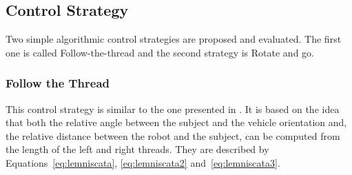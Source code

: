 \documentclass[journal]{IEEEtran}
\begin{document}
%
%
%
%



\subsection{Control Strategy}

Two simple algorithmic control strategies are proposed and evaluated.  The first one is called Follow-the-thread and the second strategy is Rotate and go.  %

\subsubsection{Follow the Thread}

This control strategy is similar to the one presented in \cite{Ortlieb2016}.  It is based on the idea that both the relative angle between the subject and the vehicle orientation and, the relative distance between the robot and the subject, can be computed from the length of the left and right threads.  They are described by Equations~\ref{eq:lemniscata}, \ref{eq:lemniscata2} and~\ref{eq:lemniscata3}.
\end{document}
